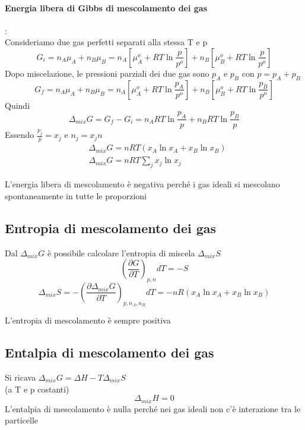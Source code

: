 \documentclass{article}
\newcommand{\dpar}[3]{\left(\frac{\partial #1}{\partial #2}\right)_{#3}d#2}
\begin{document}
\paragraph{Energia libera di Gibbs di mescolamento dei gas}:\\
Consideriamo due gas perfetti separati alla stessa T e p
\begin{equation*}
    G_i=n_A\mu_A+n_B\mu_B=n_A\left[\mu_A^o+RT\ln\frac{p}{p^o}\right]+n_B\left[ \mu_B^o+RT\ln\frac{p}{p^o}\right]
\end{equation*}
Dopo miscelazione, le pressioni parziali dei due gas sono $p_A$ e $p_B$ con $p=p_A+p_B$
\begin{equation*}
    G_f=n_A\mu_A+n_B\mu_B=n_A\left[\mu_A^o+RT\ln\frac{p_A}{p^o}\right]+n_B\left[ \mu_B^o+RT\ln\frac{p_B}{p^o}\right]
\end{equation*}
Quindi
\begin{equation*}
    \Delta_{mix}G=G_f-G_i=n_ART\ln\frac{p_A}{p}+n_BRT\ln\frac{p_B}{p}
\end{equation*}
Essendo $\frac{p_j}{p}=x_j$ e $n_j=x_jn$
\begin{align*}
    &\Delta_{mix}G=nRT(x_A\ln x_A+x_B\ln x_B)\\
    &\Delta_{mix}G=nRT\sum_jx_j\ln x_j
\end{align*}
\begin{center}
    L'energia libera di mescolamento è negativa perché i gas ideali si mescolano spontaneamente in tutte le proporzioni
\end{center}

\subsection{Entropia di mescolamento dei gas}
Dal $\Delta_{mix}G$ è possibile calcolare l'entropia di miscela $\Delta_{mix}S$
\begin{equation*}
    \dpar{G}{T}{p,n}=-S
\end{equation*}
\begin{equation*}
    \Delta_{mix}S=-\dpar{\Delta_{mix}G}{T}{p, n_A, n_B}=-nR(x_A\ln x_A+x_B\ln x_B)
\end{equation*}
\begin{center}
    L'entropia di mescolamento è sempre positiva
\end{center} 

\subsection{Entalpia di mescolamento dei gas}
Si ricava $\Delta_{mix}G=\Delta H-T\Delta_{mix}S$\\
(a T e p costanti)
\begin{equation*}
    \Delta_{mix}H=0
\end{equation*}
L'entalpia di mescolamento è nulla perché nei gas ideali non c'è interazione tra le particelle
\end{document}
